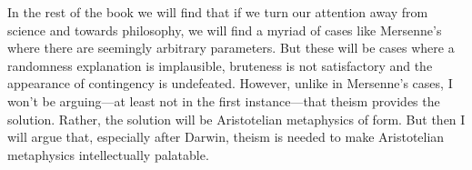 In the rest of the book we will find that if we turn our attention away from science and towards philosophy, we will
find a myriad of cases like Mersenne's where there are seemingly arbitrary parameters. But these will be cases where
a randomness explanation is implausible, bruteness is not satisfactory and the appearance of contingency is undefeated. However, 
unlike in Mersenne's cases, I won't be arguing---at least not in the first instance---that theism provides the solution. Rather, the 
solution will be Aristotelian metaphysics of form. But then I will argue that, especially after Darwin, theism is needed
to make Aristotelian metaphysics intellectually palatable.
\chaptertail 

